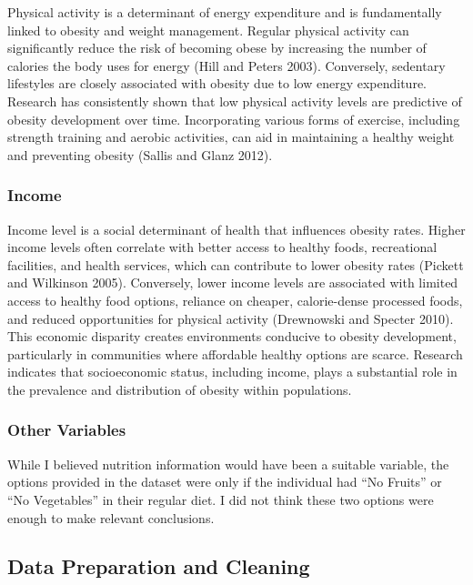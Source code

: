 \documentclass[
  letterpaper,
  DIV=11,
  numbers=noendperiod]{scrartcl}
\begin{document}
Physical activity is a determinant of energy expenditure and is
fundamentally linked to obesity and weight management. Regular physical
activity can significantly reduce the risk of becoming obese by
increasing the number of calories the body uses for energy (Hill and
Peters 2003). Conversely, sedentary lifestyles are closely associated
with obesity due to low energy expenditure. Research has consistently
shown that low physical activity levels are predictive of obesity
development over time. Incorporating various forms of exercise,
including strength training and aerobic activities, can aid in
maintaining a healthy weight and preventing obesity (Sallis and Glanz
2012).

\hypertarget{income}{%
\subsubsection{Income}\label{income}}

Income level is a social determinant of health that influences obesity
rates. Higher income levels often correlate with better access to
healthy foods, recreational facilities, and health services, which can
contribute to lower obesity rates (Pickett and Wilkinson 2005).
Conversely, lower income levels are associated with limited access to
healthy food options, reliance on cheaper, calorie-dense processed
foods, and reduced opportunities for physical activity (Drewnowski and
Specter 2010). This economic disparity creates environments conducive to
obesity development, particularly in communities where affordable
healthy options are scarce. Research indicates that socioeconomic
status, including income, plays a substantial role in the prevalence and
distribution of obesity within populations.

\hypertarget{other-variables}{%
\subsubsection{Other Variables}\label{other-variables}}

While I believed nutrition information would have been a suitable
variable, the options provided in the dataset were only if the
individual had ``No Fruits'' or ``No Vegetables'' in their regular diet.
I did not think these two options were enough to make relevant
conclusions.

\hypertarget{data-preparation-and-cleaning}{%
\subsection{Data Preparation and
Cleaning}\label{data-preparation-and-cleaning}}
\end{document}
